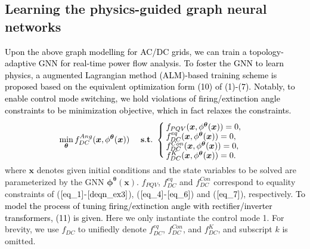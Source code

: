 \documentclass[lettersize,journal]{IEEEtran}
\begin{document}
\vspace{-2.5ex}
 \subsection{Learning the physics-guided graph neural networks}
\textcolor{black}{Upon the above graph modelling for AC/DC grids, we can train a topology-adaptive GNN for real-time power flow analysis. To foster the GNN to learn physics, a augmented Lagrangian method (ALM)-based training scheme is proposed based on the equivalent optimization form (10) of (1)-(7). Notably, to enable control mode switching, we hold violations of firing/extinction angle constraints to be minimization objective, which in fact relaxes the constraints.}
\vspace{-1ex}
\begin{equation}
\label{eq_10} 
 \min\limits_{\boldsymbol{\theta}}  f_{DC}^{Ang}(\boldsymbol{x}, \mathcal{\phi}^{\boldsymbol{\theta}}(\boldsymbol{x})) \ \ \ \ \rm \bold s. \rm \bold t.  \ 
\begin{cases}
  \vspace{-0.3em}
  f_{PQV}(\boldsymbol{x}, \mathcal{\phi}^{\boldsymbol{\theta}}(\boldsymbol{x})) = 0, \\
  \vspace{-0.3em}
  f_{DC}^{eq}(\boldsymbol{x}, \mathcal{\phi}^{\boldsymbol{\theta}}(\boldsymbol{x})) = 0, \\
  \vspace{-0.3em}
  f_{DC}^{Con}(\boldsymbol{x}, \mathcal{\phi}^{\boldsymbol{\theta}}(\boldsymbol{x}))  = 0, \\ 
  \vspace{-0.3em}
  f_{DC}^{K}(\boldsymbol{x}, \mathcal{\phi}^{\boldsymbol{\theta}}(\boldsymbol{x})) = 0.
\end{cases}  
\end{equation}
where $\boldsymbol{x}$ denotes given initial conditions and the state variables to be solved are parameterized by the GNN $\boldsymbol{\phi}^{\boldsymbol{\theta}}({\boldsymbol x})$. $f_{PQV}$, $f_{DC}^{eq}$ and $f_{DC}^{Con}$ correspond to equality constraints of ($\ref{eq_1}$-$\ref{deqn_ex3}$), ($\ref{eq_4}$-$\ref{eq_6}$) and ($\ref{eq_7}$), respectively. \textcolor{black}{To model the process of tuning firing/extinction angle with rectifier/inverter transformers, (11) is given.} Here we only instantiate the control mode 1. For brevity, we use $f_{DC}$ to unifiedly denote $f_{DC}^{eq}$, $f_{DC}^{Con}$, and $f_{DC}^{K}$, and subscript $k$ is omitted.
\end{document}
